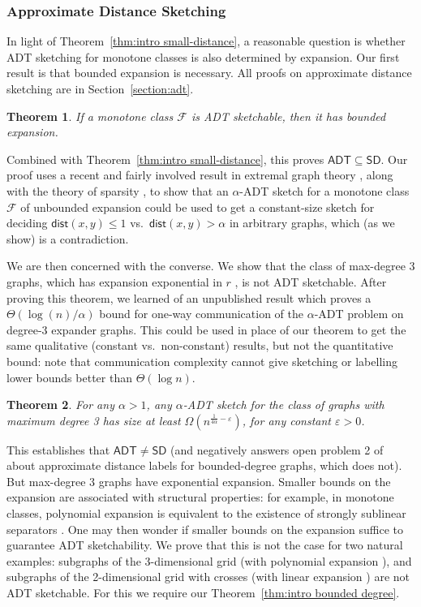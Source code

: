 \documentclass[11pt]{article}
\newtheorem{thm}{Theorem}[section]
\theoremstyle{definition}
\newcommand{\eps}{\varepsilon}
\renewcommand{\leq}{\leqslant}
\def\F {{\mathcal F}}
\newcommand{\dist}{\mathsf{dist}}
\begin{document}
\subsubsection{Approximate Distance Sketching}
\label{section:intro adt}
In light of Theorem~\ref{thm:intro small-distance}, a reasonable question is whether ADT sketching
for monotone classes is also determined by expansion. Our first result is that bounded expansion is
necessary. All proofs on approximate distance sketching are in Section~\ref{section:adt}.

\begin{thm}
If a monotone class $\F$ is ADT sketchable, then it has bounded expansion.
\end{thm}
\noindent
Combined with Theorem~\ref{thm:intro small-distance}, this proves $\mathsf{ADT} \subseteq
\mathsf{SD}$. Our proof uses a recent and fairly involved result in
extremal graph theory \cite{LM20}, along with the
theory of sparsity \cite{NO12}, to show that an $\alpha$-ADT sketch for a monotone class $\F$ of
unbounded expansion could be used to get a constant-size sketch for deciding $\dist(x,y) \leq 1$
vs.~$\dist(x,y) > \alpha$ in arbitrary graphs, which (as we show) is a contradiction.

 

We are then concerned with the converse. We show that the class of max-degree 3 graphs, which has
expansion exponential in $r$ \cite{NO08}, is not ADT sketchable. After proving this theorem, we
learned of an unpublished result \cite{AK08} which proves a $\Theta(\log(n) /\alpha)$ bound for
one-way communication of the $\alpha$-ADT problem on degree-3 expander graphs. This could be used in
place of our theorem to get the same qualitative (constant vs.~non-constant) results, but not the
quantitative bound: note that communication complexity cannot give sketching or labelling lower
bounds better than $\Theta(\log n)$.

\begin{thm}
\label{thm:intro bounded degree}
For any $\alpha > 1$, any $\alpha$-ADT sketch for the class of graphs with maximum degree 3 has size
at least $\Omega(n^{\tfrac{1}{4\alpha}-\eps})$, for any constant $\eps > 0$.
\end{thm}
\noindent
This establishes that $\mathsf{ADT} \neq \mathsf{SD}$ (and negatively answers open problem 2 of
\cite{AG06} about approximate distance labels for bounded-degree graphs, which \cite{AK08} does
not). But max-degree 3 graphs have exponential expansion.  Smaller bounds on the expansion are
associated with structural properties: for example, in monotone classes, polynomial expansion is
equivalent to the existence of strongly sublinear separators \cite{DN16}.  One may then wonder if
smaller bounds on the expansion suffice to guarantee ADT sketchability. We prove that this is not
the case for two natural examples: subgraphs of the 3-dimensional grid (with polynomial expansion
\cite{NO12}), and subgraphs of the 2-dimensional grid with crosses (with linear expansion
\cite{Dvo21}) are not ADT sketchable. For this we require our Theorem~\ref{thm:intro bounded
degree}.
\end{document}
